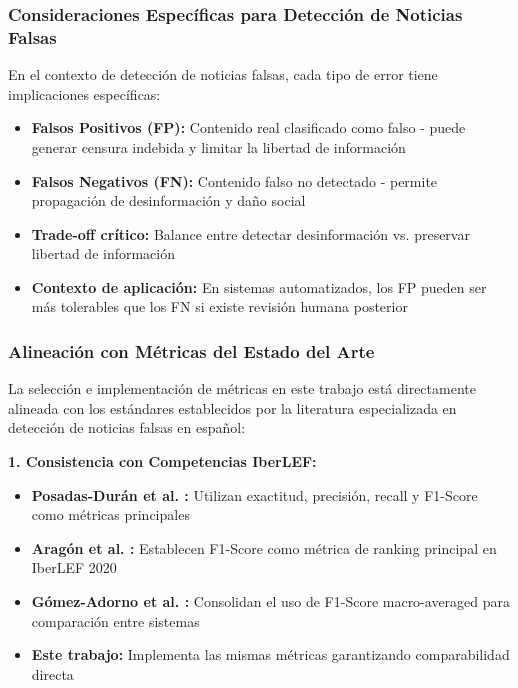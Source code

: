 \subsubsection{Consideraciones Específicas para Detección de Noticias Falsas}

En el contexto de detección de noticias falsas, cada tipo de error tiene implicaciones específicas:

\begin{itemize}
    \item \textbf{Falsos Positivos (FP):} Contenido real clasificado como falso - puede generar censura indebida y limitar la libertad de información
    \item \textbf{Falsos Negativos (FN):} Contenido falso no detectado - permite propagación de desinformación y daño social
    \item \textbf{Trade-off crítico:} Balance entre detectar desinformación vs. preservar libertad de información
    \item \textbf{Contexto de aplicación:} En sistemas automatizados, los FP pueden ser más tolerables que los FN si existe revisión humana posterior
\end{itemize}

\subsubsection{Alineación con Métricas del Estado del Arte}

La selección e implementación de métricas en este trabajo está directamente alineada con los estándares establecidos por la literatura especializada en detección de noticias falsas en español:

\textbf{1. Consistencia con Competencias IberLEF:}
\begin{itemize}
    \item \textbf{Posadas-Durán et al. \cite{posadas2019detection}:} Utilizan exactitud, precisión, recall y F1-Score como métricas principales
    \item \textbf{Aragón et al. \cite{aragon2020overview}:} Establecen F1-Score como métrica de ranking principal en IberLEF 2020
    \item \textbf{Gómez-Adorno et al. \cite{gomez2021overview}:} Consolidan el uso de F1-Score macro-averaged para comparación entre sistemas
    \item \textbf{Este trabajo:} Implementa las mismas métricas garantizando comparabilidad directa
\end{itemize}

